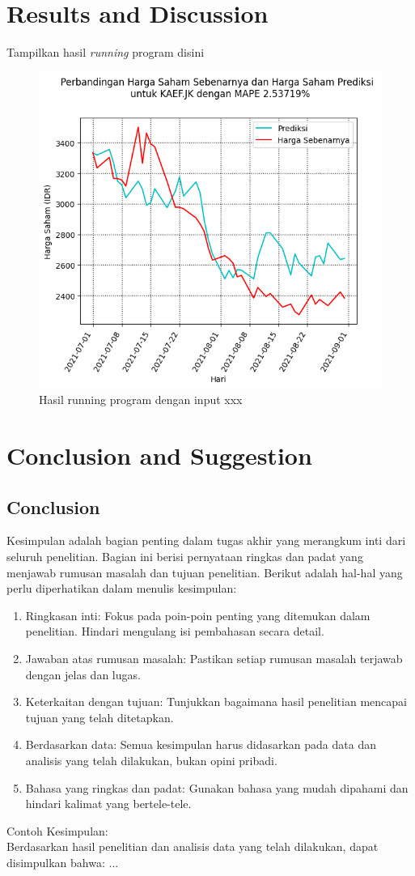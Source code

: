 \documentclass[english,12pt,a4paper]{book}
\begin{document}
\chapter{Results and Discussion}
Tampilkan hasil \textit{running} program disini
\begin{figure}
	\centering
	\includegraphics[width=\linewidth]{KAEF}
	\caption{Hasil running program dengan input xxx}
	\label{fig:kaef}
\end{figure}

\chapter{Conclusion and Suggestion}
\section{Conclusion}
Kesimpulan adalah bagian penting dalam tugas akhir yang merangkum inti dari seluruh penelitian. Bagian ini berisi pernyataan ringkas dan padat yang menjawab rumusan masalah dan tujuan penelitian. Berikut adalah hal-hal yang perlu diperhatikan dalam menulis kesimpulan:
\begin{enumerate}
	\item Ringkasan inti: Fokus pada poin-poin penting yang ditemukan dalam penelitian. Hindari mengulang isi pembahasan secara detail.
	\item Jawaban atas rumusan masalah: Pastikan setiap rumusan masalah terjawab dengan jelas dan lugas.
	\item Keterkaitan dengan tujuan: Tunjukkan bagaimana hasil penelitian mencapai tujuan yang telah ditetapkan.
	\item Berdasarkan data: Semua kesimpulan harus didasarkan pada data dan analisis yang telah dilakukan, bukan opini pribadi.
	\item Bahasa yang ringkas dan padat: Gunakan bahasa yang mudah dipahami dan hindari kalimat yang bertele-tele.
\end{enumerate}
Contoh Kesimpulan:\\
Berdasarkan hasil penelitian dan analisis data yang telah dilakukan, dapat disimpulkan bahwa: ...
\end{document}
